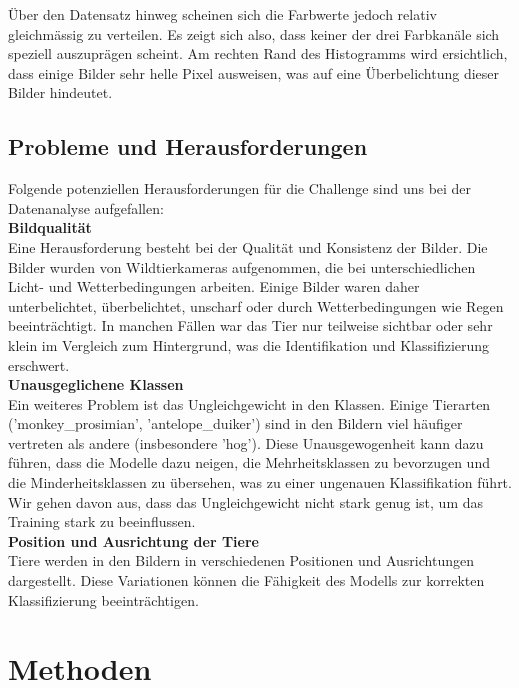 \documentclass{article}
\begin{document}
\noindent
Über den Datensatz hinweg scheinen sich die Farbwerte jedoch relativ gleichmässig zu verteilen. Es zeigt sich also, dass keiner der drei Farbkanäle sich speziell auszuprägen scheint. Am rechten Rand des Histogramms wird ersichtlich, dass einige Bilder sehr helle Pixel ausweisen, was auf eine Überbelichtung dieser Bilder hindeutet.

\subsection{Probleme und Herausforderungen}

Folgende potenziellen Herausforderungen für die Challenge sind uns bei der Datenanalyse aufgefallen:\\

\noindent
\textbf{Bildqualität}\\
Eine Herausforderung besteht bei der Qualität und Konsistenz der Bilder. Die Bilder wurden von Wildtierkameras aufgenommen, die bei unterschiedlichen Licht- und Wetterbedingungen arbeiten. Einige Bilder waren daher unterbelichtet, überbelichtet, unscharf oder durch Wetterbedingungen wie Regen beeinträchtigt. In manchen Fällen war das Tier nur teilweise sichtbar oder sehr klein im Vergleich zum Hintergrund, was die Identifikation und Klassifizierung erschwert.\\

\noindent
\textbf{Unausgeglichene Klassen}\\
Ein weiteres Problem ist das Ungleichgewicht in den Klassen. Einige Tierarten ('monkey\_prosimian', 'antelope\_duiker') sind in den Bildern viel häufiger vertreten als andere (insbesondere 'hog'). Diese Unausgewogenheit kann dazu führen, dass die Modelle dazu neigen, die Mehrheitsklassen zu bevorzugen und die Minderheitsklassen zu übersehen, was zu einer ungenauen Klassifikation führt. Wir gehen davon aus, dass das Ungleichgewicht nicht stark genug ist, um das Training stark zu beeinflussen.\\
 
\noindent
\textbf{Position und Ausrichtung der Tiere}\\
Tiere werden in den Bildern in verschiedenen Positionen und Ausrichtungen dargestellt. Diese Variationen können die Fähigkeit des Modells zur korrekten Klassifizierung beeinträchtigen.\\

\newpage

\section{Methoden}
\end{document}
